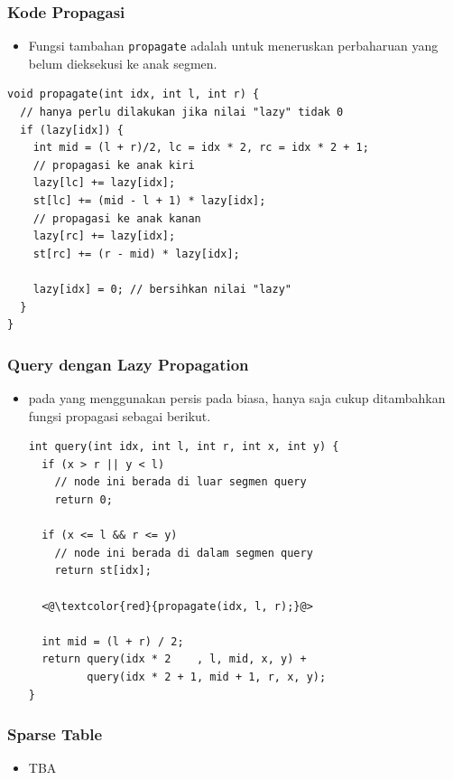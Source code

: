 \begin{frame}[fragile]
\frametitle{Kode Propagasi}
\begin{itemize}
  \item Fungsi tambahan \lstinline{propagate} adalah untuk meneruskan perbaharuan yang belum dieksekusi ke anak segmen.
\end{itemize}
  \begin{lstlisting}
void propagate(int idx, int l, int r) {
  // hanya perlu dilakukan jika nilai "lazy" tidak 0
  if (lazy[idx]) { 
    int mid = (l + r)/2, lc = idx * 2, rc = idx * 2 + 1;
    // propagasi ke anak kiri
    lazy[lc] += lazy[idx];
    st[lc] += (mid - l + 1) * lazy[idx]; 
    // propagasi ke anak kanan
    lazy[rc] += lazy[idx];
    st[rc] += (r - mid) * lazy[idx];

    lazy[idx] = 0; // bersihkan nilai "lazy"
  }
}
\end{lstlisting}
\end{frame}

\begin{frame}[fragile]
\frametitle{Query dengan Lazy Propagation}
\begin{itemize}
  \item \fQuery pada \fsegmentTree yang menggunakan \flazyPropagation persis pada \fquery biasa, hanya saja cukup ditambahkan fungsi propagasi sebagai berikut.
  \begin{lstlisting}
int query(int idx, int l, int r, int x, int y) {
  if (x > r || y < l)
    // node ini berada di luar segmen query
    return 0;

  if (x <= l && r <= y)
    // node ini berada di dalam segmen query
    return st[idx];

  <@\textcolor{red}{propagate(idx, l, r);}@>
  
  int mid = (l + r) / 2;
  return query(idx * 2    , l, mid, x, y) + 
         query(idx * 2 + 1, mid + 1, r, x, y);
}
\end{lstlisting}
\end{itemize}
\end{frame}

\begin{frame}
\frametitle{Sparse Table}
\begin{itemize}
  \item TBA
\end{itemize}
\end{frame}


